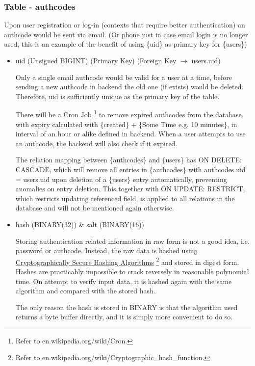 \documentclass[12pt]{report}
\newcommand{\n}{\par}
\begin{document}
\subsubsection{Table - authcodes} \label{data-layer.design.user-system.authcodes}
Upon user registration or log-in (contexts that require better authentication) an authcode would be sent via email.
(Or phone just in case email login is no longer used, this is an example of the benefit of using \{uid\} as primary key for \{users\})
\begin{itemize}
	\item uid (Unsigned BIGINT) (Primary Key) (Foreign Key $\rightarrow$ users.uid)\n
	      Only a single email authcode would be valid for a user at a time,
	      before sending a new authcode in backend the old one (if exists) would be deleted.
	      Therefore, uid is sufficiently unique as the primary key of the table.\n
	      There will be a \href{https://en.wikipedia.org/wiki/Cron}{Cron Job}
	      \footnote{Refer to en.wikipedia.org/wiki/Cron.}
	      to remove expired authcodes from the database,
	      with expiry calculated with \{created\} + \{Some Time e.g. 10 minutes\},
	      in interval of an hour or alike defined in backend.
	      When a user attempts to use an authcode, the backend will also check if it expired.\n
	      The relation mapping between \{authcodes\} and \{users\} has ON DELETE: CASCADE,
	      which will remove all entries in \{authcodes\} with authcodes.uid = users.uid upon deletion of a \{users\} entry automatically,
	      preventing anomalies on entry deletion.
	      This together with ON UPDATE: RESTRICT, which restricts updating referenced field,
	      is applied to all relations in the database and will not be mentioned again otherwise.
	\item hash (BINARY(32)) \& salt (BINARY(16))\n
	      Storing authentication related information in raw form is not a good idea, i.e. password or authcode.
	      Instead, the raw data is hashed using
	      \href{https://en.wikipedia.org/wiki/Cryptographic_hash_function}{Cryptographically Secure Hashing Algorithms}
	      \footnote{Refer to en.wikipedia.org/wiki/Cryptographic\_hash\_function.}
	      and stored in digest form.
	      Hashes are practicably impossible to crack reversely in reasonable polynomial time.
	      On attempt to verify input data, it is hashed again with the same algorithm and compared with the stored hash.\n
	      The only reason the hash is stored in BINARY is that the algorithm used returns a byte buffer directly, and it is simply more convenient to do so.

\end{itemize}
\end{document}
